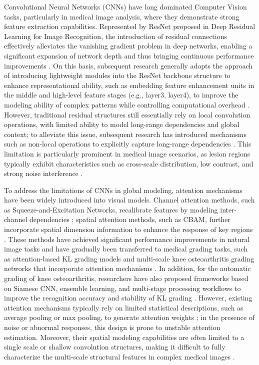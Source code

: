\documentclass[letterpaper, 10 pt, conference]{ieeeconf}  %
\begin{document}
Convolutional Neural Networks (CNNs) have long dominated Computer Vision tasks, particularly in medical image analysis, where they demonstrate strong feature extraction capabilities\cite{1}. Represented by ResNet proposed in Deep Residual Learning for Image Recognition, the introduction of residual connections effectively alleviates the vanishing gradient problem in deep networks, enabling a significant expansion of network depth and thus bringing continuous performance improvements \cite{4}. On this basis, subsequent research generally adopts the approach of introducing lightweight modules into the ResNet backbone structure to enhance representational ability, such as embedding feature enhancement units in the middle and high-level feature stages (e.g., layer3, layer4), to improve the modeling ability of complex patterns while controlling computational overhead \cite{5}\cite{6}\cite{7}\cite{8}\cite{15}. However, traditional residual structures still essentially rely on local convolution operations, with limited ability to model long-range dependencies and global context; to alleviate this issue, subsequent research has introduced mechanisms such as non-local operations to explicitly capture long-range dependencies \cite{16}. This limitation is particularly prominent in medical image scenarios, as lesion regions typically exhibit characteristics such as cross-scale distribution, low contrast, and strong noise interference \cite{1}\cite{23}\cite{27}.

To address the limitations of CNNs in global modeling, attention mechanisms have been widely introduced into visual models. Channel attention methods, such as Squeeze-and-Excitation Networks, recalibrate features by modeling inter-channel dependencies \cite{5}; spatial attention methods, such as CBAM, further incorporate spatial dimension information to enhance the response of key regions \cite{6}. These methods have achieved significant performance improvements in natural image tasks and have gradually been transferred to medical grading tasks, such as attention-based KL grading models and multi-scale knee osteoarthritis grading networks that incorporate attention mechanisms \cite{7}\cite{8}. In addition, for the automatic grading of knee osteoarthritis, researchers have also proposed frameworks based on Siamese CNN, ensemble learning, and multi-stage processing workflows to improve the recognition accuracy and stability of KL grading \cite{18}\cite{19}\cite{20}\cite{21}. However, existing attention mechanisms typically rely on limited statistical descriptions, such as average pooling or max pooling, to generate attention weights \cite{5}\cite{6}; in the presence of noise or abnormal responses, this design is prone to unstable attention estimation. Moreover, their spatial modeling capabilities are often limited to a single scale or shallow convolution structures, making it difficult to fully characterize the multi-scale structural features in complex medical images \cite{6}\cite{7}\cite{8}\cite{13}\cite{14}.
\end{document}
